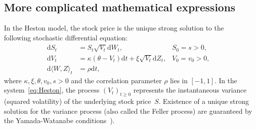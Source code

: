 \documentclass[a4paper, twoside]{report}
\theoremstyle{definition}
\newcommand{\D}{\mathrm{d}}
\numberwithin{equation}{section}
\begin{document}
\subsection{More complicated mathematical expressions}
In the Heston model, the stock price is the unique strong solution to the following stochastic differential equation:
\begin{equation}\label{eq:Heston}
  \begin{array}{rll}
    \D S_t                   & = S_t \sqrt{V_t} \D W_t,                        & S_0 = s>0,   \\
    \D V_t                   & = \kappa(\theta-V_t)\D t + \xi\sqrt{V_t}\D Z_t, & V_0 = v_0>0, \\
    \D \langle W, Z\rangle_t & = \rho \D t,
  \end{array}
\end{equation}
where $\kappa, \xi, \theta, v_0, s>0$ and the correlation parameter $\rho$ lies in $[-1,1]$.
In the system~\eqref{eq:Heston}, the process $(V_t)_{t\geq 0}$ represents the instantaneous
variance (squared volatility) of the underlying stock price~$S$.
Existence of a unique strong solution for the variance process (also called the Feller process)
are guaranteed by the Yamada-Watanabe conditions~\cite[Proposition 2.13, page 291]{karatzas1991brownian}).


\end{document}
